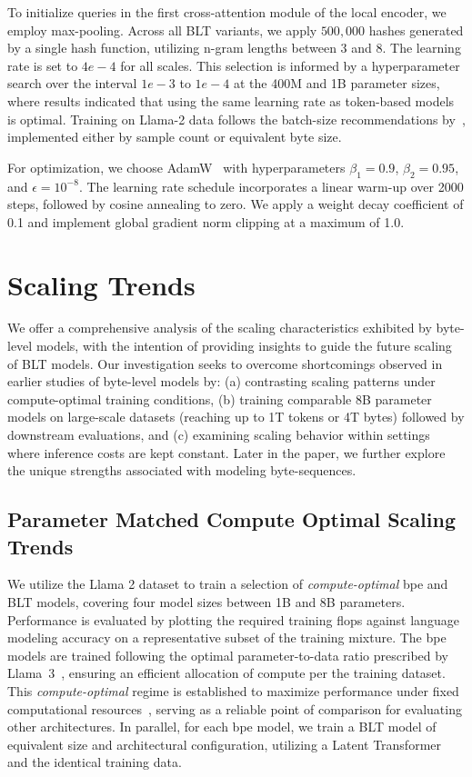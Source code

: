 To initialize queries in the first cross-attention module of the local encoder, we employ max-pooling. Across all {\textsc BLT} variants, we apply $500,000$ hashes generated by a single hash function, utilizing n-gram lengths between 3 and 8. The learning rate is set to $4e-4$ for all scales. This selection is informed by a hyperparameter search over the interval $1e-3$ to $1e-4$ at the 400M and 1B parameter sizes, where results indicated that using the same learning rate as token-based models is optimal. Training on Llama-2 data follows the batch-size recommendations by~\cite{dubey2024llama}, implemented either by sample count or equivalent byte size.

For optimization, we choose AdamW~\citep{adamw} with hyperparameters $\beta_1=0.9$, $\beta_2=0.95$, and $\epsilon=10^{-8}$. The learning rate schedule incorporates a linear warm-up over 2000 steps, followed by cosine annealing to zero. We apply a weight decay coefficient of 0.1 and implement global gradient norm clipping at a maximum of 1.0.

\section{Scaling Trends}
\label{section:scaling}

We offer a comprehensive analysis of the scaling characteristics exhibited by byte-level models, with the intention of providing insights to guide the future scaling of {\textsc BLT} models. Our investigation seeks to overcome shortcomings observed in earlier studies of byte-level models by: (a) contrasting scaling patterns under compute-optimal training conditions, (b) training comparable 8B parameter models on large-scale datasets (reaching up to 1T tokens or 4T bytes) followed by downstream evaluations, and (c) examining scaling behavior within settings where inference costs are kept constant. Later in the paper, we further explore the unique strengths associated with modeling byte-sequences.

\subsection{Parameter Matched Compute Optimal Scaling Trends}
\label{section:parameter-matched-scaling}
We utilize the Llama 2 dataset to train a selection of \textit{compute-optimal} bpe and {\textsc BLT} models, covering four model sizes between 1B and 8B parameters. Performance is evaluated by plotting the required training flops against language modeling accuracy on a representative subset of the training mixture. The bpe models are trained following the optimal parameter-to-data ratio prescribed by Llama~3~\citep{dubey2024llama}, ensuring an efficient allocation of compute per the training dataset. This \textit{compute-optimal} regime is established to maximize performance under fixed computational resources~\citep{hoffmann2022training}, serving as a reliable point of comparison for evaluating other architectures. In parallel, for each bpe model, we train a {\textsc BLT} model of equivalent size and architectural configuration, utilizing a Latent Transformer and the identical training data.

